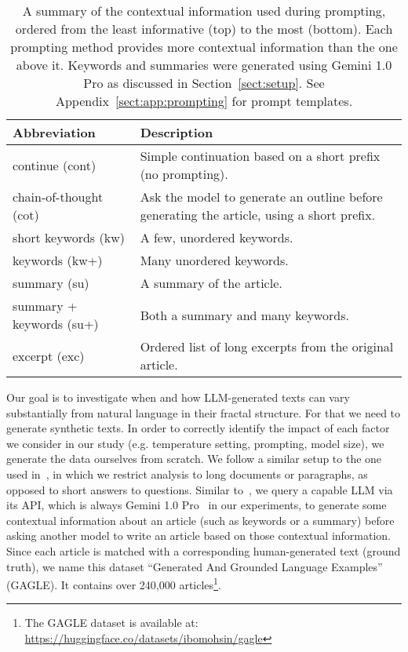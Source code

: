 \begin{table}[t]
    \centering\footnotesize
    \caption{A summary of the contextual information used during prompting, ordered from the least informative (top) to the most (bottom). Each prompting method provides more contextual information than the one above it. Keywords and summaries were generated using Gemini 1.0 Pro as discussed in Section~\ref{sect:setup}. See Appendix~\ref{sect:app:prompting} for prompt templates.
    }
    \label{tab:context}
\begin{tabularx}{\linewidth}{X|X}
  \toprule
  \bf Abbreviation & \bf Description\\ \midrule
\ttfamily continue (cont)&Simple continuation based on a short prefix (no prompting).\\[0.1cm]
\ttfamily chain-of-thought (cot)&Ask the model to generate an outline before generating the article, using a short prefix.\\[0.1cm]
\ttfamily short keywords (kw)&A few, unordered keywords.\\[0.1cm]
\ttfamily keywords (kw+)&Many unordered keywords.\\[0.1cm]
\ttfamily summary (su)&A summary of the article.\\[0.1cm] 
\ttfamily summary + keywords (su+)&Both a summary and many keywords.\\[0.1cm] 
\ttfamily excerpt (exc)&Ordered list of long excerpts from the original article.\\
  \bottomrule
  \end{tabularx}
\end{table}

Our goal is to investigate when and how LLM-generated texts can vary substantially from natural language in their fractal structure.   For that we need to generate synthetic texts. In order to correctly identify the impact of each factor we consider in our study (e.g. temperature setting, prompting, model size), we generate the data ourselves from scratch. We follow a similar setup to the one used in~\cite{verma-etal-2024-ghostbuster}, in which we restrict analysis to long documents or paragraphs, as opposed to short answers to questions. Similar to~\cite{verma-etal-2024-ghostbuster}, we query a capable LLM via its API, which is always Gemini 1.0 Pro~\citep{geminiteam2024geminifamilyhighlycapable} in our experiments, to generate some contextual information about an article (such as keywords or a summary) before asking another model to write an article based on those contextual information. Since each article is matched with a corresponding human-generated text (ground truth), we name this dataset ``Generated And Grounded Language Examples'' (GAGLE). It contains over 240,000 articles\footnote{The GAGLE dataset is available at: \url{https://huggingface.co/datasets/ibomohsin/gagle}}. 

